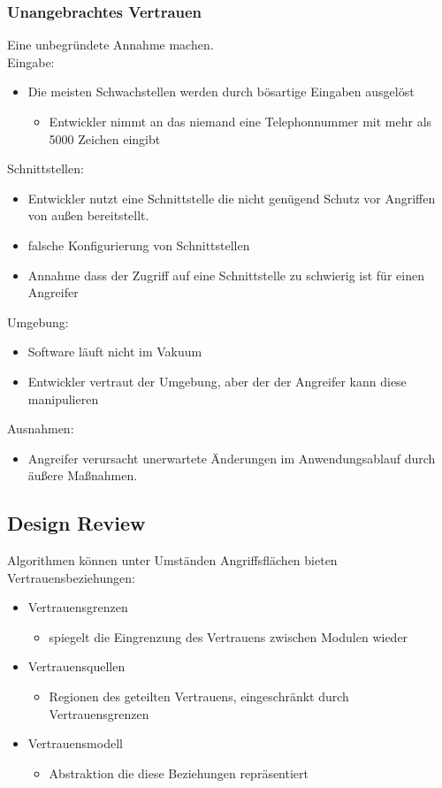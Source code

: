 \documentclass{article} %
\begin{document}
\subsubsection{Unangebrachtes Vertrauen}
Eine unbegründete Annahme machen.\\
Eingabe:
\begin{itemize}
	\item Die meisten Schwachstellen werden durch bösartige Eingaben ausgelöst
    
    \begin{itemize}
        \item Entwickler nimmt an das niemand eine Telephonnummer mit mehr als 5000 Zeichen eingibt
    \end{itemize}
\end{itemize}
Schnittstellen:
\begin{itemize}
	\item Entwickler nutzt eine Schnittstelle die nicht genügend Schutz vor Angriffen von außen bereitstellt.
    \item falsche Konfigurierung von Schnittstellen
    \item Annahme dass der Zugriff auf eine Schnittstelle zu schwierig ist für einen Angreifer
\end{itemize}
Umgebung:
\begin{itemize}
	\item Software läuft nicht im Vakuum
    \item Entwickler vertraut der Umgebung, aber der der Angreifer kann diese manipulieren
\end{itemize}
Ausnahmen:
\begin{itemize}
	\item Angreifer verursacht unerwartete Änderungen im Anwendungsablauf durch äußere Maßnahmen.
\end{itemize}
\subsection{Design Review}
Algorithmen können unter Umständen Angriffsflächen bieten\\
Vertrauensbeziehungen:
\begin{itemize}
	\item Vertrauensgrenzen
    
    \begin{itemize}
        \item spiegelt die Eingrenzung des Vertrauens zwischen Modulen wieder
    \end{itemize}
    \item Vertrauensquellen
    
    \begin{itemize}
        \item Regionen des geteilten Vertrauens, eingeschränkt durch Vertrauensgrenzen
    \end{itemize}
    \item Vertrauensmodell
    
    \begin{itemize}
        \item Abstraktion die diese Beziehungen repräsentiert
    \end{itemize}
\end{itemize}
\end{document}
